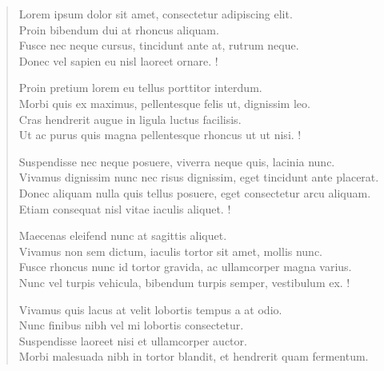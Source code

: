 \begin{verse}
Lorem ipsum dolor sit amet, consectetur adipiscing elit.\\
Proin bibendum dui at rhoncus aliquam.\\
Fusce nec neque cursus, tincidunt ante at, rutrum neque.\\
Donec vel sapien eu nisl laoreet ornare.
!

Proin pretium lorem eu tellus porttitor interdum.\\
Morbi quis ex maximus, pellentesque felis ut, dignissim leo.\\
Cras hendrerit augue in ligula luctus facilisis.\\
Ut ac purus quis magna pellentesque rhoncus ut ut nisi.
!

Suspendisse nec neque posuere, viverra neque quis, lacinia nunc.\\
Vivamus dignissim nunc nec risus dignissim, eget tincidunt ante placerat.\\
Donec aliquam nulla quis tellus posuere, eget consectetur arcu aliquam.\\
Etiam consequat nisl vitae iaculis aliquet.
!

Maecenas eleifend nunc at sagittis aliquet.\\
Vivamus non sem dictum, iaculis tortor sit amet, mollis nunc.\\
Fusce rhoncus nunc id tortor gravida, ac ullamcorper magna varius.\\
Nunc vel turpis vehicula, bibendum turpis semper, vestibulum ex.
!

Vivamus quis lacus at velit lobortis tempus a at odio.\\
Nunc finibus nibh vel mi lobortis consectetur.\\
Suspendisse laoreet nisi et ullamcorper auctor.\\
Morbi malesuada nibh in tortor blandit, et hendrerit quam fermentum.\\



\end{verse}
